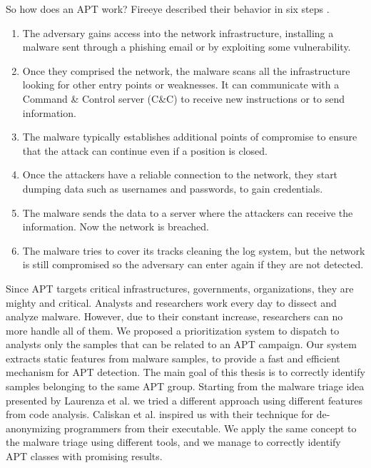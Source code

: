 So how does an APT work? Fireeye described their behavior in six steps \cite{fireeye_anatomy}.

\begin{enumerate}
	\item The adversary gains access into the network infrastructure, installing a malware sent through a phishing email or by exploiting some vulnerability.
	\item Once they comprised the network, the malware scans all the infrastructure looking for other entry points or weaknesses. It can communicate with a Command \& Control server (C\&C) to receive new instructions or to send information.
	\item The malware typically establishes additional points of compromise to ensure that the attack can continue even if a position is closed.
	\item Once the attackers have a reliable connection to the network, they start dumping data such as usernames and passwords, to gain credentials.
	
	\item The malware sends the data to a server where the attackers can receive the information. Now the network is breached.
	
	\item The malware tries to cover its tracks cleaning the log system, but the network is still compromised so the adversary can enter again if they are not detected.
\end{enumerate}

Since APT targets critical infrastructures, governments, organizations, they are mighty and critical. Analysts and researchers work every day to dissect and analyze malware. However, due to their constant increase, researchers can no more handle all of them. 
We proposed a prioritization system to dispatch to analysts only the samples that can be related to an APT campaign. Our system extracts static features from malware samples, to provide a fast and efficient mechanism for APT detection. The main goal of this thesis is to correctly identify samples belonging to the same APT group. Starting from the malware triage \cite{laurenza2017malware} idea presented by Laurenza et al. we tried a different approach using different features from code analysis. Caliskan et al. \cite{caliskan2015anonymizing} inspired us with their technique for de-anonymizing programmers from their executable. We apply the same concept to the malware triage using different tools, and we manage to correctly identify APT classes with promising results. 

